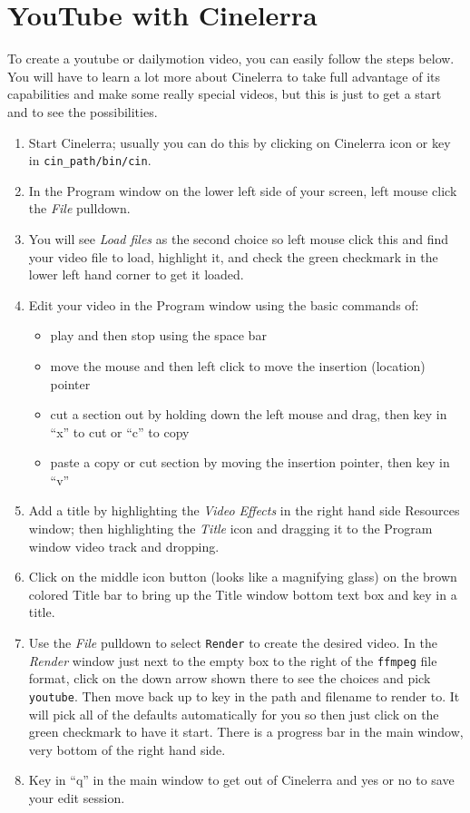 \section{YouTube with Cinelerra}%
\label{sec:youtube_with_cinelerra}

To create a youtube or dailymotion video, you can easily follow the steps below.  You will have to learn a lot more about Cinelerra to take full advantage of its capabilities and make some really special videos, but this is just to get a start and to see the possibilities.

\begin{enumerate}
	\item Start Cinelerra; usually you can do this by clicking on Cinelerra icon or key in \texttt{{cin\_path}/bin/cin}.
	\item In the Program window on the lower left side of your screen, left mouse click the \textit{File} pulldown.
	\item You will see \textit{Load files} as the second choice so left mouse click this and find your video file to
	load, highlight it, and check the green checkmark in the lower left hand corner to get it loaded.
	\item Edit your video in the Program window using the basic commands of:
	\begin{itemize}
		\item play and then stop using the space bar
		\item move the mouse and then left click to move the insertion (location) pointer
		\item cut a section out by holding down the left mouse and drag, then key in “x” to cut or “c” to copy
		\item paste a copy or cut section by moving the insertion pointer, then key in “v”
	\end{itemize}
    \item Add a title by highlighting the \textit{Video Effects} in the right hand side Resources window; then
    highlighting the \textit{Title} icon and dragging it to the Program window video track and dropping.
    \item Click on the middle icon button (looks like a magnifying glass) on the brown colored Title bar to
    bring up the Title window bottom text box and key in a title.
    \item Use the \textit{File} pulldown to select \texttt{Render} to create the desired video.  In the \textit{Render} window just next to the empty box to the right of the \texttt{ffmpeg} file format, click on the down arrow shown there
    to see the choices and pick \texttt{youtube}.  Then move back up to key in the path and filename to render
    to.  It will pick all of the defaults automatically for you so then just click on the green checkmark to
    have it start.  There is a progress bar in the main window, very bottom of the right hand side.
    \item Key in “q” in the main window to get out of Cinelerra and yes or no to save your edit session.
\end{enumerate}

